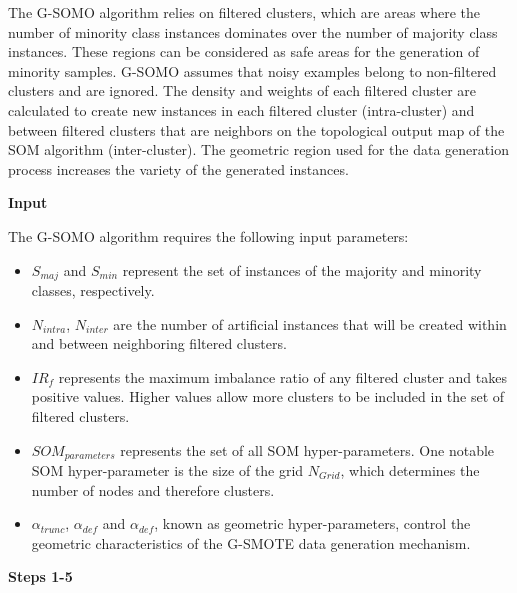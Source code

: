 \documentclass[parskip=full]{scrartcl}
\begin{document}
The G-SOMO algorithm relies on filtered clusters, which are areas where the number of minority class instances dominates over the number of majority class instances. These regions can be considered as safe areas for the generation of minority samples. G-SOMO assumes that noisy examples belong to non-filtered clusters and are ignored. The density and weights of each filtered cluster are calculated to create new instances in each filtered cluster (intra-cluster) and between filtered clusters that are neighbors on the topological output map of the SOM algorithm (inter-cluster). The geometric region used for the data generation process increases the variety of the generated instances.

\textbf{Input}

The G-SOMO algorithm requires the following input parameters:

\begin{itemize}

	\renewcommand\labelitemi{--}

	\item $S_{maj}$ and $S_{min}$ represent the set of instances of the majority and minority classes, respectively.

	\item $N_{intra}$, $N_{inter}$ are the number of artificial instances that will be created within and between neighboring filtered clusters.

	\item $IR_{f}$ represents the maximum imbalance ratio of any filtered cluster and takes positive values. Higher values allow more clusters to be included in the set of filtered clusters.

	\item $SOM_{parameters}$ represents the set of all SOM hyper-parameters. One notable SOM hyper-parameter is the size of the grid $N_{Grid}$, which determines the number of nodes and therefore clusters.

	\item $\alpha_{trunc}$, $\alpha_{def}$ and $\alpha_{def}$, known as geometric hyper-parameters, control the geometric characteristics of the G-SMOTE data generation mechanism.

\end{itemize}

\textbf{Steps 1-5}
\end{document}
